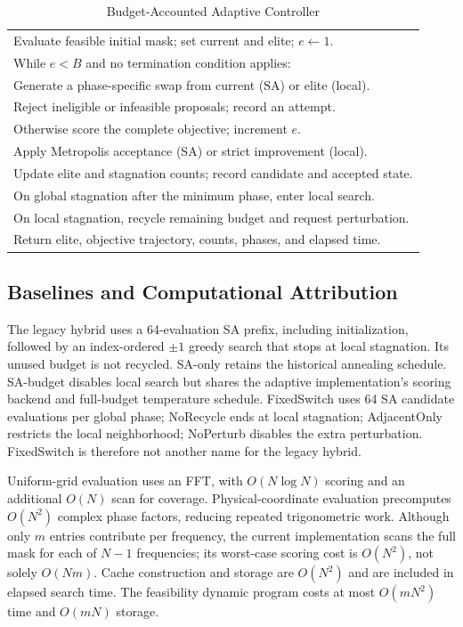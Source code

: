 \documentclass[journal]{IEEEtran}
\begin{document}
\begin{table}[t]
\caption{Budget-Accounted Adaptive Controller}
\label{tab:algorithm}
\centering\footnotesize
\begin{tabular}{p{}}
\toprule
Evaluate feasible initial mask; set current and elite; $e\leftarrow1$.\\
While $e<B$ and no termination condition applies:\\
\quad Generate a phase-specific swap from current (SA) or elite (local).\\
\quad Reject ineligible or infeasible proposals; record an attempt.\\
\quad Otherwise score the complete objective; increment $e$.\\
\quad Apply Metropolis acceptance (SA) or strict improvement (local).\\
\quad Update elite and stagnation counts; record candidate and accepted state.\\
\quad On global stagnation after the minimum phase, enter local search.\\
\quad On local stagnation, recycle remaining budget and request perturbation.\\
Return elite, objective trajectory, counts, phases, and elapsed time.\\
\bottomrule
\end{tabular}
\end{table}

\subsection{Baselines and Computational Attribution}
The legacy hybrid uses a 64-evaluation SA prefix, including initialization, followed by an index-ordered $\pm1$ greedy search that stops at local stagnation. Its unused budget is not recycled. SA-only retains the historical annealing schedule. SA-budget disables local search but shares the adaptive implementation's scoring backend and full-budget temperature schedule. FixedSwitch uses 64 SA candidate evaluations per global phase; NoRecycle ends at local stagnation; AdjacentOnly restricts the local neighborhood; NoPerturb disables the extra perturbation. FixedSwitch is therefore not another name for the legacy hybrid.

Uniform-grid evaluation uses an FFT, with $O(N\log N)$ scoring and an additional $O(N)$ scan for coverage. Physical-coordinate evaluation precomputes $O(N^2)$ complex phase factors, reducing repeated trigonometric work. Although only $m$ entries contribute per frequency, the current implementation scans the full mask for each of $N-1$ frequencies; its worst-case scoring cost is $O(N^2)$, not solely $O(Nm)$. Cache construction and storage are $O(N^2)$ and are included in elapsed search time. The feasibility dynamic program costs at most $O(mN^2)$ time and $O(mN)$ storage.
\end{document}
